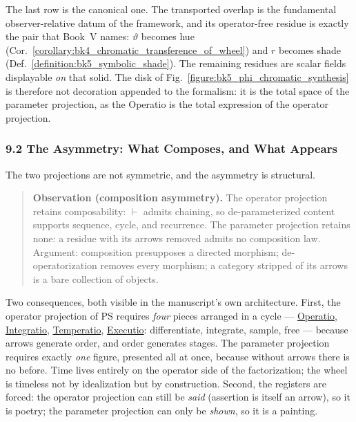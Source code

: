 \noindent
The last row is the canonical one. The transported overlap is the fundamental
observer-relative datum of the framework, and its operator-free residue is
exactly the pair that Book~V names: $\vartheta$ becomes hue
(Cor.~\ref{corollary:bk4_chromatic_transference_of_wheel}) and $r$ becomes
shade (Def.~\ref{definition:bk5_symbolic_shade}). The remaining residues are
scalar fields displayable \emph{on} that solid. The disk of
Fig.~\ref{figure:bk5_phi_chromatic_synthesis} is therefore not decoration
appended to the formalism: it is the total space of the parameter projection,
as the Operatio is the total expression of the operator projection.

\subsubsection*{9.2 The Asymmetry: What Composes, and What Appears}

The two projections are not symmetric, and the asymmetry is structural.

\begin{quote}
\textbf{Observation (composition asymmetry).}
The operator projection retains composability: $\vdash$ admits chaining, so
de-parameterized content supports sequence, cycle, and recurrence. The
parameter projection retains none: a residue with its arrows removed admits
no composition law. Argument: composition presupposes a directed morphism;
de-operatorization removes every morphism; a category stripped of its arrows
is a bare collection of objects.
\end{quote}

\noindent
Two consequences, both visible in the manuscript's own architecture. First,
the operator projection of PS requires \emph{four} pieces arranged in a cycle
--- \hyperref[sec:bk1_operatio]{Operatio},
\hyperref[sec:bk5_integratio]{Integratio},
\hyperref[sec:bk6_temperatio]{Temperatio},
\hyperref[sec:bk1_executio]{Executio}: differentiate, integrate, sample, free
--- because arrows generate order, and order generates stages. The parameter
projection requires exactly \emph{one} figure, presented all at once, because
without arrows there is no before. Time lives entirely on the operator side
of the factorization; the wheel is timeless not by idealization but by
construction. Second, the registers are forced: the operator projection can
still be \emph{said} (assertion is itself an arrow), so it is poetry; the
parameter projection can only be \emph{shown}, so it is a painting.

